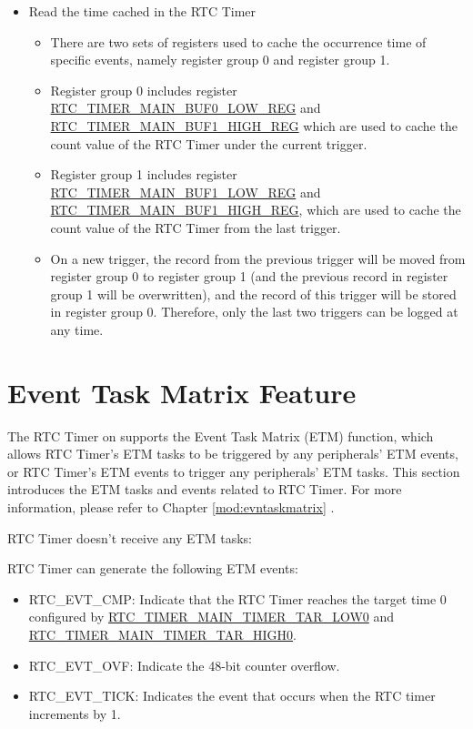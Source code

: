 \documentclass[main\_\_EN.tex]{subfiles}
\begin{document}
\begin{itemize}
    \item Read the time cached in the RTC Timer
    \begin{itemize}
        \item There are two sets of registers used to cache the occurrence time of specific events, namely register group 0 and register group 1.
        \item Register group 0 includes register \hyperref[regdesc:RTCTIMERMAINBUF0LOWREG]{RTC\_TIMER\_MAIN\_BUF0\_LOW\_REG} and \hyperref[regdesc:RTCTIMERMAINBUF1HIGHREG]{RTC\_TIMER\_MAIN\_BUF1\_HIGH\_REG} which are used to cache the count value of the RTC Timer under the current trigger.
        \item Register group 1 includes register \hyperref[regdesc:RTCTIMERMAINBUF1LOWREG]{RTC\_TIMER\_MAIN\_BUF1\_LOW\_REG} and \hyperref[regdesc:RTCTIMERMAINBUF1HIGHREG]{RTC\_TIMER\_MAIN\_BUF1\_HIGH\_REG}, which are used to cache the count value of the RTC Timer from the last trigger.
        \item On a new trigger, the record from the previous trigger will be moved from register group 0 to register group 1 (and the previous record in register group 1 will be overwritten), and the record of this trigger will be stored in register group 0. Therefore, only the last two triggers can be logged at any time.

    \end{itemize}
\end{itemize}



\section{Event Task Matrix Feature}
\label{sec:rtctimer-etm-func}


The RTC Timer on \chipname{} supports the Event Task Matrix (ETM) function, which allows RTC Timer's ETM tasks to be triggered by any peripherals' ETM events, or RTC Timer's ETM events to trigger any peripherals' ETM tasks. This section introduces the ETM tasks and events related to RTC Timer. For more information, please refer to Chapter \ref{mod:evntaskmatrix} .

RTC Timer doesn't receive any ETM tasks:

RTC Timer can generate the following ETM events:

\begin{itemize}
    \item RTC\_EVT\_CMP: Indicate that the RTC Timer reaches the target time 0 configured by \hyperref[regdesc:RTCTIMERTAR0LOWREG]{RTC\_TIMER\_MAIN\_TIMER\_TAR\_LOW0} and \hyperref[regdesc:RTCTIMERTAR0HIGHREG]{RTC\_TIMER\_MAIN\_TIMER\_TAR\_HIGH0}.
    \item RTC\_EVT\_OVF: Indicate the 48-bit counter overflow.
    \item RTC\_EVT\_TICK: Indicates the event that occurs when the RTC timer increments by 1.
\end{itemize}
\end{document}
